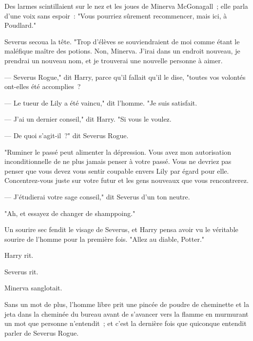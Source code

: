 Des larmes scintillaient sur le nez et les joues de Minerva McGonagall~; elle parla d'une voix sans espoir~: "Vous pourriez sûrement recommencer, mais ici, à Poudlard."

Severus secoua la tête. "Trop d'élèves se souviendraient de moi comme étant le maléfique maître des potions. Non, Minerva. J'irai dans un endroit nouveau, je prendrai un nouveau nom, et je trouverai une nouvelle personne à aimer.

--- Severus Rogue," dit Harry, parce qu'il fallait qu'il le dise, "toutes vos volontés ont-elles été accomplies~?

--- Le tueur de Lily a été vaincu," dit l'homme. "Je suis satisfait.

--- J'ai un dernier conseil," dit Harry. "Si vous le voulez.

--- De quoi s'agit-il~?" dit Severus Rogue.

"Ruminer le passé peut alimenter la dépression. Vous avez mon autorisation inconditionnelle de ne plus jamais penser à votre passé. Vous ne devriez pas penser que vous devez vous sentir coupable envers Lily par égard pour elle. Concentrez-vous juste sur votre futur et les gens nouveaux que vous rencontrerez.

--- J'étudierai votre sage conseil," dit Severus d'un ton neutre.

"Ah, et essayez de changer de shamppoing."

Un sourire sec fendit le visage de Severus, et Harry pensa avoir vu le véritable sourire de l'homme pour la première fois. "Allez au diable, Potter."

Harry rit.

Severus rit.

Minerva sanglotait.

Sans un mot de plus, l'homme libre prit une pincée de poudre de cheminette et la jeta dans la cheminée du bureau avant de s'avancer vers la flamme en murmurant un mot que personne n'entendit~; et c'est la dernière fois que quiconque entendit parler de Severus Rogue. 
